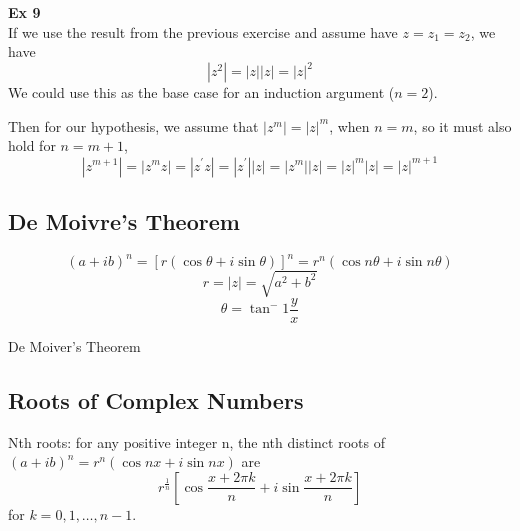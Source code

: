 \textbf{Ex 9}
\\
If we use the result from the previous exercise and assume have $z = z_1 = z_2$, we have
$$
|z^2| = |z||z| = |z|^2
$$
We could use this as the base case for an induction argument ($n=2$).

Then for our hypothesis, we assume that $|z^m| = |z|^m$, when $n=m$, so it must also
hold for $n=m+1$,
$$
|z^{m+1}| = |z^m z| = |z^\prime z| = |z^\prime| |z| = |z^m| |z| = |z|^m |z| = |z|^{m+1}
$$


\subsection{De Moivre's Theorem}
$$
(a + ib)^n = [r(\cos \theta + i \sin \theta)]^n = r^n (\cos n\theta + i \sin n\theta)
$$
$$
r = |z| = \sqrt{a^2 + b^2}
$$
$$
\theta = \tan^-1 \frac{y}{x}
$$

De Moiver's Theorem 

\subsection{Roots of Complex Numbers}

Nth roots: for any positive integer n, the nth distinct roots of
$(a+ ib)^n = r^n (\cos nx +i\sin nx)$ are
$$
r^{\frac{1}{n}} \left[\cos \frac{x + 2\pi k}{n} + i\sin \frac{x + 2\pi k}{n}\right]
$$
for $k = 0, 1, \dots, n-1$.